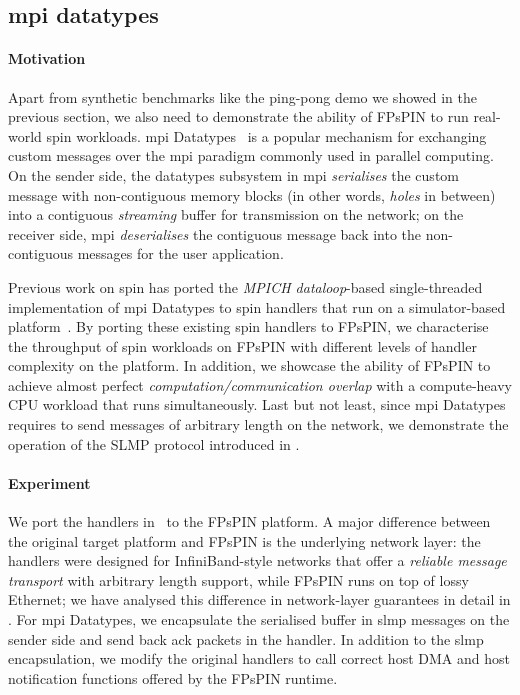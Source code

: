 \subsection{\acs{mpi} datatypes} \label{sec:mpi-datatypes-demo}

\paragraph{Motivation} Apart from synthetic benchmarks like the ping-pong demo we showed in the previous section, we also need to demonstrate the ability of FPsPIN to run real-world \ac{spin} workloads.  \Ac{mpi} Datatypes~\cite{pierce_types_2002} is a popular mechanism for exchanging custom messages over the \ac{mpi} paradigm commonly used in parallel computing.  On the sender side, the datatypes subsystem in \ac{mpi} \emph{serialises} the custom message with non-contiguous memory blocks (in other words, \emph{holes} in between) into a contiguous \emph{streaming} buffer for transmission on the network; on the receiver side, \ac{mpi} \emph{deserialises} the contiguous message back into the non-contiguous messages for the user application.

Previous work on \ac{spin} has ported the \emph{MPICH dataloop}-based single-threaded implementation of \ac{mpi} Datatypes to \ac{spin} handlers that run on a simulator-based platform~\cite{di_girolamo_network-accelerated_2019}.  By porting these existing \ac{spin} handlers to FPsPIN, we characterise the throughput of \ac{spin} workloads on FPsPIN with different levels of handler complexity on the platform.  In addition, we showcase the ability of FPsPIN to achieve almost perfect \emph{computation/communication overlap} with a compute-heavy CPU workload that runs simultaneously.  Last but not least, since \ac{mpi} Datatypes requires to send messages of arbitrary length on the network, we demonstrate the operation of the SLMP protocol introduced in .

\paragraph{Experiment} We port the handlers in~\cite{di_girolamo_network-accelerated_2019} to the FPsPIN platform.
A major difference between the original target platform and FPsPIN is the underlying network layer: the handlers were designed for InfiniBand-style networks that offer a \emph{reliable message transport} with arbitrary length support, while FPsPIN runs on top of lossy Ethernet; we have analysed this difference in network-layer guarantees in detail in .  For \ac{mpi} Datatypes, we encapsulate the serialised buffer in \ac{slmp} messages on the sender side and send back \ac{ack} packets in the handler.  In addition to the \ac{slmp} encapsulation, we modify the original handlers to call correct host DMA and host notification functions offered by the FPsPIN runtime.

